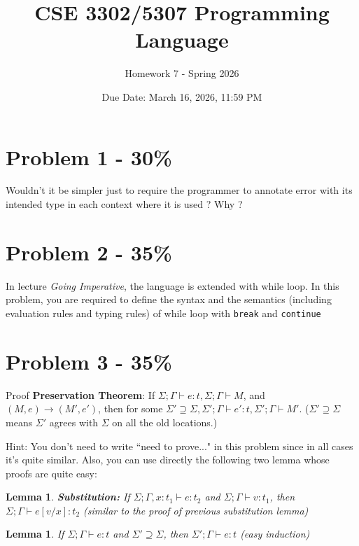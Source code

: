 \documentclass{article}
\newtheorem{lemma}[thm]{Lemma}
\begin{document}
\title{CSE 3302/5307 Programming Language}
\author{Homework 7 - Spring 2026}
\date{Due Date: March 16, 2026, 11:59 PM}
\maketitle
\thispagestyle{fancy}


\section*{Problem 1 - 30\%}

Wouldn't it be simpler just to require the programmer to annotate error with its intended type in each context where it is used ? Why ?


\section*{Problem 2 - 35\%}

In lecture \emph{Going Imperative}, the language is extended with while loop.
In this problem, you are required to define the syntax and the semantics
(including evaluation rules and typing rules) of while loop with \texttt{break} and \texttt{continue}


\section*{Problem 3 - 35\%}

Proof \textbf{Preservation Theorem}: If $\Sigma;\Gamma \vdash e:t, \Sigma;\Gamma \vdash M$, and $(M,e)\rightarrow(M',e')$, then for some $\Sigma' \supseteq \Sigma, \Sigma';\Gamma \vdash e':t, \Sigma';\Gamma \vdash M'$. ($\Sigma' \supseteq \Sigma$ means $\Sigma'$ agrees with $\Sigma$ on all the old locations.)
	
Hint: You don't need to write ``need to prove..." in this problem since in all cases it's quite similar. Also, you can use directly the following two lemma whose proofs are quite easy:
\begin{lemma}

\textbf{Substitution:} If $\Sigma;\Gamma, x:t_1 \vdash e:t_2$ and $\Sigma;\Gamma \vdash v:t_1$, then $\Sigma;\Gamma \vdash e[v/x]:t_2$
(similar to the proof of previous substitution lemma)
\end{lemma}

\begin{lemma}
If $\Sigma;\Gamma \vdash e:t$ and $\Sigma' \supseteq \Sigma$, then $\Sigma';\Gamma \vdash e:t$
(easy induction)
\end{lemma}


\vspace{20pt}
\vspace{0.8em}
\end{document}
